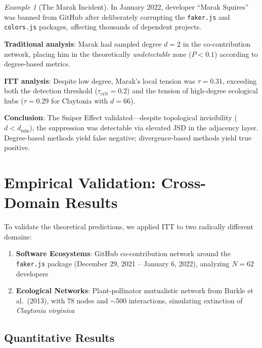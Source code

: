 \documentclass[11pt,a4paper]{article}
\theoremstyle{definition}
\theoremstyle{remark}
\newtheorem{example}{Example}[section]
\begin{document}
\begin{example}[The Marak Incident]
\label{ex:marak}
In January 2022, developer ``Marak Squires'' was banned from GitHub after deliberately corrupting the \texttt{faker.js} and \texttt{colors.js} packages, affecting thousands of dependent projects.

\textbf{Traditional analysis}: Marak had sampled degree $d = 2$ in the co-contribution network, placing him in the theoretically \emph{undetectable} zone ($P < 0.1$) according to degree-based metrics.

\textbf{ITT analysis}: Despite low degree, Marak's local tension was $\tau = 0.31$, exceeding both the detection threshold ($\tau_{\text{crit}} = 0.2$) and the tension of high-degree ecological hubs ($\tau = 0.29$ for Claytonia with $d = 66$).

\textbf{Conclusion}: The Sniper Effect validated---despite topological invisibility ($d < d_{\min}$), the suppression was detectable via elevated JSD in the adjacency layer. Degree-based methods yield false negative; divergence-based methods yield true positive.
\end{example}

\section{Empirical Validation: Cross-Domain Results}

To validate the theoretical predictions, we applied ITT to two radically different domains:

\begin{enumerate}
    \item \textbf{Software Ecosystems}: GitHub co-contribution network around the \texttt{faker.js} package (December 29, 2021 -- January 6, 2022), analyzing $N=62$ developers
    
    \item \textbf{Ecological Networks}: Plant-pollinator mutualistic network from Burkle et al.\ (2013), with 78 nodes and $\sim$500 interactions, simulating extinction of \textit{Claytonia virginica}
\end{enumerate}

\subsection{Quantitative Results}
\end{document}
